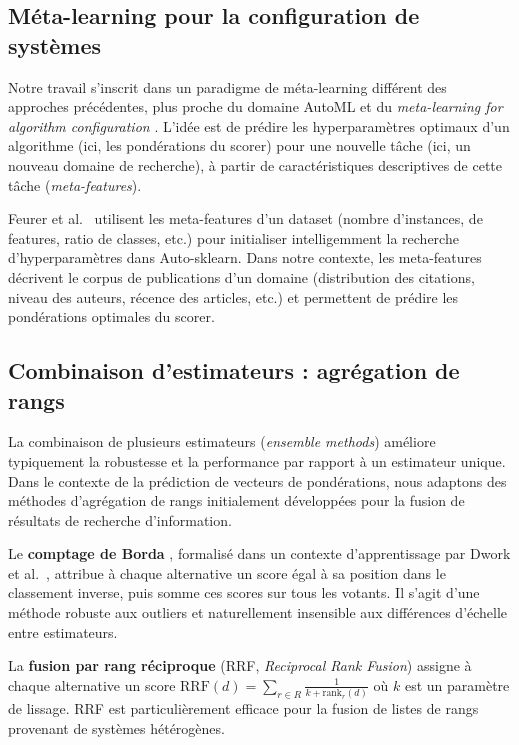 \subsection{Méta-learning pour la configuration de systèmes}

Notre travail s'inscrit dans un paradigme de méta-learning différent des
approches précédentes, plus proche du domaine AutoML \cite{hutter2019automated}
et du \textit{meta-learning for algorithm configuration}
\cite{feurer2015initializing}. L'idée est de prédire les hyperparamètres
optimaux d'un algorithme (ici, les pondérations du scorer) pour une nouvelle
tâche (ici, un nouveau domaine de recherche), à partir de caractéristiques
descriptives de cette tâche (\textit{meta-features}).

Feurer et al.\ \cite{feurer2015initializing} utilisent les meta-features
d'un dataset (nombre d'instances, de features, ratio de classes, etc.) pour
initialiser intelligemment la recherche d'hyperparamètres dans Auto-sklearn.
Dans notre contexte, les meta-features décrivent le corpus de publications
d'un domaine (distribution des citations, niveau des auteurs, récence des
articles, etc.) et permettent de prédire les pondérations optimales du scorer.

\subsection{Combinaison d'estimateurs : agrégation de rangs}

La combinaison de plusieurs estimateurs (\textit{ensemble methods}) améliore
typiquement la robustesse et la performance par rapport à un estimateur unique.
Dans le contexte de la prédiction de vecteurs de pondérations, nous adaptons
des méthodes d'agrégation de rangs initialement développées pour la fusion
de résultats de recherche d'information.

Le \textbf{comptage de Borda} \cite{borda1784memoire}, formalisé dans un
contexte d'apprentissage par Dwork et al.\ \cite{dwork2001rank}, attribue
à chaque alternative un score égal à sa position dans le classement inverse,
puis somme ces scores sur tous les votants. Il s'agit d'une méthode robuste
aux outliers et naturellement insensible aux différences d'échelle entre
estimateurs.

La \textbf{fusion par rang réciproque} (RRF, \textit{Reciprocal Rank Fusion})
\cite{cormack2009reciprocal} assigne à chaque alternative un score
$\text{RRF}(d) = \sum_{r \in R} \frac{1}{k + \text{rank}_r(d)}$ où $k$ est
un paramètre de lissage. RRF est particulièrement efficace pour la fusion
de listes de rangs provenant de systèmes hétérogènes.

